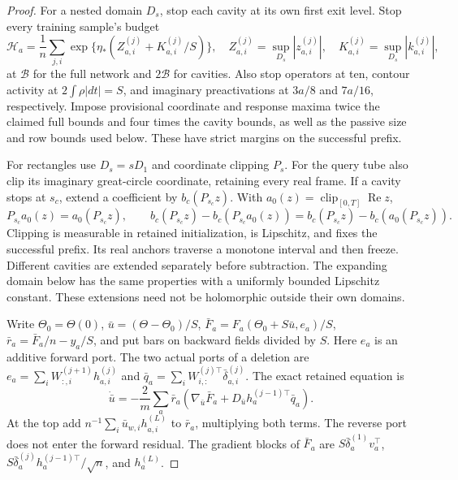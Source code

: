 \begin{proof}
For a nested domain \(D_s\), stop each cavity at its own first exit
level.  Stop every training sample's budget
\begin{equation}
 \mathcal H_a=\frac1n\sum_{j,i}
 \exp\{\eta_*(Z_{a,i}^{(j)}+K_{a,i}^{(j)}/S)\},\quad
 Z_{a,i}^{(j)}=\sup_{D_s}|z_{a,i}^{(j)}|,\quad
 K_{a,i}^{(j)}=\sup_{D_s}|k_{a,i}^{(j)}|,
 \label{cp:src-budget}
\end{equation}
at \(\mathcal B\) for the full network and \(2\mathcal B\) for
cavities.  Also stop operators at ten, contour activity at
\(2\int\rho|dt|=S\), and imaginary preactivations at \(3a/8\)
and \(7a/16\), respectively.  Impose provisional coordinate and
response maxima twice the claimed full bounds and four times the
cavity bounds, as well as the passive size and row bounds used below.
These have strict margins on the successful prefix.

For rectangles use \(D_s=sD_1\) and coordinate clipping \(P_s\).
For the query tube also clip its imaginary great-circle coordinate,
retaining every real frame.  If a cavity stops at \(s_c\), extend a
coefficient by \(b_c(P_{s_c}z)\).  With
\(a_0(z)=\operatorname{clip}_{[0,T]}\operatorname{Re}z\),
\begin{equation}
 P_{s_c}a_0(z)=a_0(P_{s_c}z),\qquad
 b_c(P_{s_c}z)-b_c(P_{s_c}a_0(z))
   =b_c(P_{s_c}z)-b_c(a_0(P_{s_c}z)).
 \label{cp:src-clipped}
\end{equation}
Clipping is measurable in retained initialization, is Lipschitz, and
fixes the successful prefix.  Its real anchors traverse a monotone
interval and then freeze.  Different cavities are extended separately
before subtraction.  The expanding domain below has the same
properties with a uniformly bounded Lipschitz constant.  These
extensions need not be holomorphic outside their own domains.

Write \(\Theta_0=\Theta(0)\), \(\bar u=(\Theta-\Theta_0)/S\),
\(\bar F_a=F_a(\Theta_0+S\bar u,e_a)/S\),
\(\bar r_a=\bar F_a/n-y_a/S\), and put bars on backward
fields divided by \(S\).  Here \(e_a\) is an additive forward port.
The two actual ports of a deletion are
\(e_a=\sum_iW_{:,i}^{(j+1)}h_{a,i}^{(j)}\) and
\(\bar q_a=\sum_iW_{i,:}^{(j)\top}\bar\delta_{a,i}^{(j)}\).
The exact retained equation is
\begin{equation}
 \dot{\bar u}=-\frac2m\sum_a\bar r_a
   \left(\nabla_{\bar u}\bar F_a+
           D_{\bar u}h_a^{(j-1)\top}\bar q_a\right).
 \label{cp:src-retained}
\end{equation}
At the top add \(n^{-1}\sum_i\bar u_{w,i}h_{a,i}^{(L)}\)
to \(\bar r_a\), multiplying both terms.  The reverse port does
not enter the forward residual.  The gradient blocks of \(\bar F_a\)
are \(S\bar\delta_a^{(1)}v_a^\top\),
\(S\bar\delta_a^{(j)}h_a^{(j-1)\top}/\sqrt n\), and
\(h_a^{(L)}\).


\end{proof}
